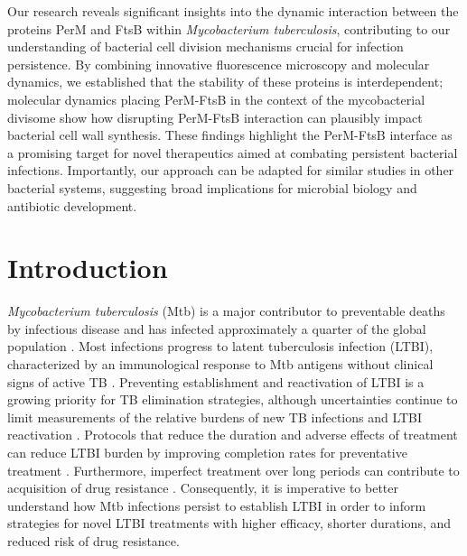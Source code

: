 \documentclass[pdflatex,sn-nature]{sn-jnl}%
\newcommand\mtb{Mtb}
\newcommand\mtbfull{\textit{Mycobacterium tuberculosis}}
\begin{document}
Our research reveals significant insights into the dynamic interaction between the proteins PerM and FtsB within \mtbfull{}, contributing to our understanding of bacterial cell division mechanisms crucial for infection persistence. By combining innovative fluorescence microscopy and molecular dynamics, we established that the stability of these proteins is interdependent; molecular dynamics placing PerM-FtsB in the context of the mycobacterial divisome show how disrupting PerM-FtsB interaction can plausibly impact bacterial cell wall synthesis. These findings highlight the PerM-FtsB interface as a promising target for novel therapeutics aimed at combating persistent bacterial infections. Importantly, our approach can be adapted for similar studies in other bacterial systems, suggesting broad implications for microbial biology and antibiotic development.

\section{Introduction}\label{sec1}

\mtbfull{} (\mtb{}) is a major contributor to preventable deaths by infectious disease and has infected approximately a quarter of the global population \citep{houbenGlobalBurdenLatent2016}.
Most infections progress to latent tuberculosis infection (LTBI), characterized by an immunological response to \mtb{} antigens without clinical signs of active TB \citep{whoLatentTuberculosisInfection2018}.
Preventing establishment and reactivation of LTBI is a growing priority for TB elimination strategies, although uncertainties continue to limit measurements of the relative burdens of new TB infections and LTBI reactivation \citep{daleQuantifyingRatesLate2021}.
Protocols that reduce the duration and adverse effects of treatment can reduce LTBI burden by improving completion rates for preventative treatment \citep{assefaEfficacySafetyDifferent2023}.
Furthermore, imperfect treatment over long periods can contribute to acquisition of drug resistance \citep{liAcquiredResistanceIsoniazid2021}.
Consequently, it is imperative to better understand how \mtb{} infections persist to establish LTBI in order to inform strategies for novel LTBI treatments with higher efficacy, shorter durations, and reduced risk of drug resistance.
\end{document}
